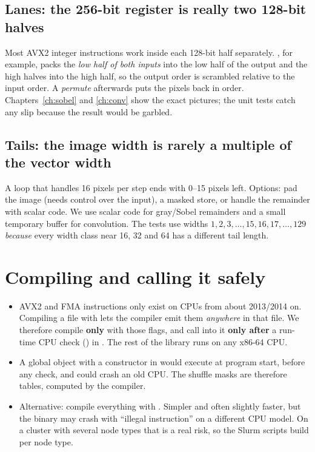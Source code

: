 \subsection{Lanes: the 256-bit register is really two 128-bit halves}

Most AVX2 integer instructions work inside each 128-bit half separately. , for example, packs the \emph{low half of both inputs} into the low half of the output and the high halves into the high half, so the output order is scrambled relative to the input order. A \emph{permute} afterwards puts the pixels back in order. Chapters~\ref{ch:sobel} and \ref{ch:conv} show the exact pictures; the unit tests catch any slip because the result would be garbled.

\subsection{Tails: the image width is rarely a multiple of the vector width}

A loop that handles 16 pixels per step ends with 0--15 pixels left. Options: pad the image (needs control over the input), a masked store, or handle the remainder with scalar code. We use scalar code for gray/Sobel remainders and a small temporary buffer for convolution. The tests use widths $1,2,3,\dots,15,16,17,\dots,129$ \emph{because} every width class near 16, 32 and 64 has a different tail length.

\section{Compiling and calling it safely}

\begin{itemize}
\item AVX2 and FMA instructions only exist on CPUs from about 2013/2014 on. Compiling a file with  lets the compiler emit them \emph{anywhere} in that file. We therefore compile \textbf{only}  with those flags, and call into it \textbf{only after} a run-time CPU check () in . The rest of the library runs on any x86-64 CPU.
\item A global object with a constructor in  would execute at program start, before any check, and could crash an old CPU. The shuffle masks are therefore  tables, computed by the compiler.
\item Alternative: compile everything with . Simpler and often slightly faster, but the binary may crash with ``illegal instruction'' on a different CPU model. On a cluster with several node types that is a real risk, so the Slurm scripts build per node type.
\end{itemize}

